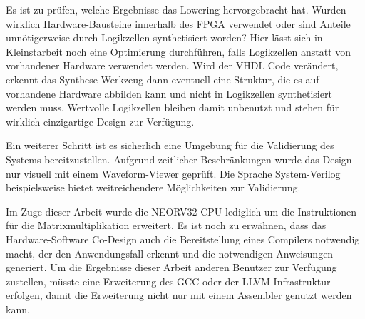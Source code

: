 Es ist zu prüfen, welche Ergebnisse das Lowering hervorgebracht hat. Wurden wirklich Hardware-Bausteine innerhalb des FPGA verwendet oder sind Anteile unnötigerweise durch Logikzellen synthetisiert worden? Hier lässt sich in Kleinstarbeit noch eine Optimierung durchführen, falls Logikzellen anstatt von vorhandener Hardware verwendet werden. Wird der VHDL Code verändert, erkennt das Synthese-Werkzeug dann eventuell eine Struktur, die es auf vorhandene Hardware abbilden kann und nicht in Logikzellen synthetisiert werden muss. Wertvolle Logikzellen bleiben damit unbenutzt und stehen für wirklich einzigartige Design zur Verfügung.

Ein weiterer Schritt ist es sicherlich eine Umgebung für die Validierung des Systems bereitzustellen. Aufgrund zeitlicher Beschränkungen wurde das Design nur visuell mit einem Waveform-Viewer geprüft. Die Sprache System-Verilog beispielsweise bietet weitreichendere Möglichkeiten zur Validierung.

Im Zuge dieser Arbeit wurde die NEORV32 CPU lediglich um die Instruktionen für die Matrixmultiplikation erweitert. Es ist noch zu erwähnen, dass das Hardware-Software Co-Design auch die Bereitstellung eines Compilers notwendig macht, der den Anwendungsfall erkennt und die notwendigen Anweisungen generiert. Um die Ergebnisse dieser Arbeit anderen Benutzer zur Verfügung zustellen, müsste eine Erweiterung des GCC oder der LLVM Infrastruktur erfolgen, damit die Erweiterung nicht nur mit einem Assembler genutzt werden kann.

